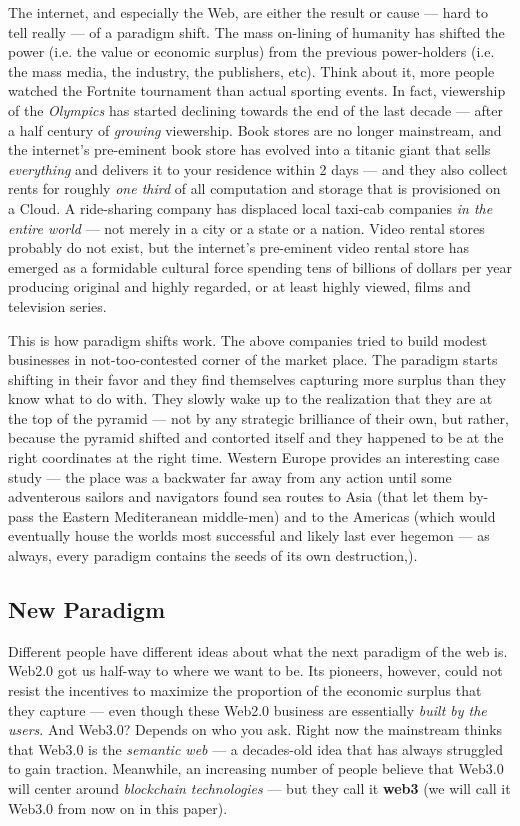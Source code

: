 \documentclass[a4paper]{article}
\begin{document}
The internet, and especially the Web, are either the result or cause ---  hard to tell really ---  of a paradigm shift. The mass on-lining of humanity has shifted the power (i.e. the value or economic surplus) from the previous power-holders (i.e. the mass media, the industry, the publishers, etc). Think about it, more people watched the Fortnite tournament than actual sporting events. In fact, viewership of the \emph{Olympics} has started declining towards the end of the last decade ---  after a half century of \emph{growing} viewership. Book stores are no longer mainstream, and the internet's pre-eminent book store has evolved into a titanic giant that sells \emph{everything} and delivers it to your residence within 2 days ---  and they also collect rents for roughly \emph{one third} of all computation and storage that is provisioned on a Cloud. A ride-sharing company has displaced local taxi-cab companies \emph{in the entire world} ---  not merely in a city or a state or a nation. Video rental stores probably do not exist, but the internet's pre-eminent video rental store has emerged as a formidable cultural force spending tens of billions of dollars per year producing original and highly regarded, or at least highly viewed, films and television series.

This is how paradigm shifts work. The above companies tried to build modest businesses in not-too-contested corner of the market place. The paradigm starts shifting in their favor and they find themselves capturing more surplus than they know what to do with. They slowly wake up to the realization that they are at the top of the pyramid ---  not by any strategic brilliance of their own, but rather, because the pyramid shifted and contorted itself and they happened to be at the right coordinates at the right time. Western Europe provides an interesting case study ---  the place was a backwater far away from any action until some adventerous sailors and navigators found sea routes to Asia (that let them by-pass the Eastern Mediteranean middle-men) and to the Americas (which would eventually house the worlds most successful and likely last ever hegemon ---  as always, every paradigm contains the seeds of its own destruction,).
\subsection{New Paradigm}
\label{New Paradigm}

Different people have different ideas about what the next paradigm of the web is. Web2.0 got us half-way to where we want to be. Its pioneers, however, could not resist the incentives to maximize the proportion of the economic surplus that they capture ---  even though these Web2.0 business are essentially \emph{built by the users}. And Web3.0? Depends on who you ask. Right now the mainstream thinks that Web3.0 is the \emph{semantic web} ---  a decades-old idea that has always struggled to gain traction. Meanwhile, an increasing number of people believe that Web3.0 will center around \emph{blockchain technologies} ---  but they call it \textbf{web3} (we will call it Web3.0 from now on in this paper).
\end{document}
